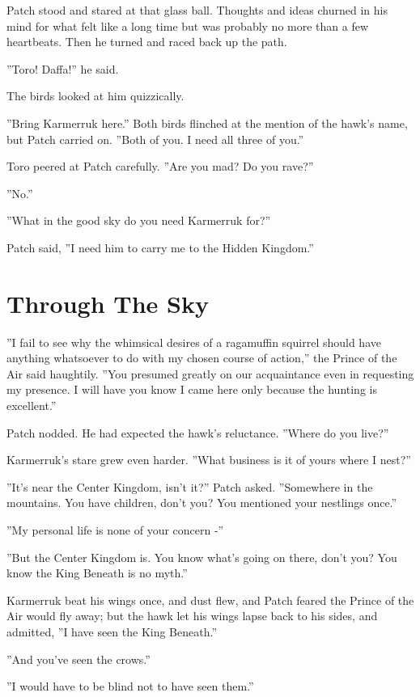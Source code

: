 \documentclass[12pt]{book}
\begin{document}
Patch stood and stared at that glass ball. Thoughts and ideas churned in his mind for what felt like a long time but was probably no more than a few heartbeats. Then he turned and raced back up the path.

''Toro! Daffa!'' he said.

The birds looked at him quizzically.

''Bring Karmerruk here.'' Both birds flinched at the mention of the hawk's name, but Patch carried on. ''Both of you. I need all three of you.''

Toro peered at Patch carefully. ''Are you mad? Do you rave?''

''No.''

''What in the good sky do you need Karmerruk for?''

Patch said, ''I need him to carry me to the Hidden Kingdom.''


\section{Through The Sky}

''I fail to see why the whimsical desires of a ragamuffin squirrel should have anything whatsoever to do with my chosen course of action,'' the Prince of the Air said haughtily. ''You presumed greatly on our acquaintance even in requesting my presence. I will have you know I came here only because the hunting is excellent.''

Patch nodded. He had expected the hawk's reluctance. ''Where do you live?''

Karmerruk's stare grew even harder. ''What business is it of yours where I nest?''

''It's near the Center Kingdom, isn't it?'' Patch asked. ''Somewhere in the mountains. You have children, don't you? You mentioned your nestlings once.''

''My personal life is none of your concern -''

''But the Center Kingdom is. You know what's going on there, don't you? You know the King Beneath is no myth.''

Karmerruk beat his wings once, and dust flew, and Patch feared the Prince of the Air would fly away; but the hawk let his wings lapse back to his sides, and admitted, ''I have seen the King Beneath.''

''And you've seen the crows.''

''I would have to be blind not to have seen them.''
\end{document}
